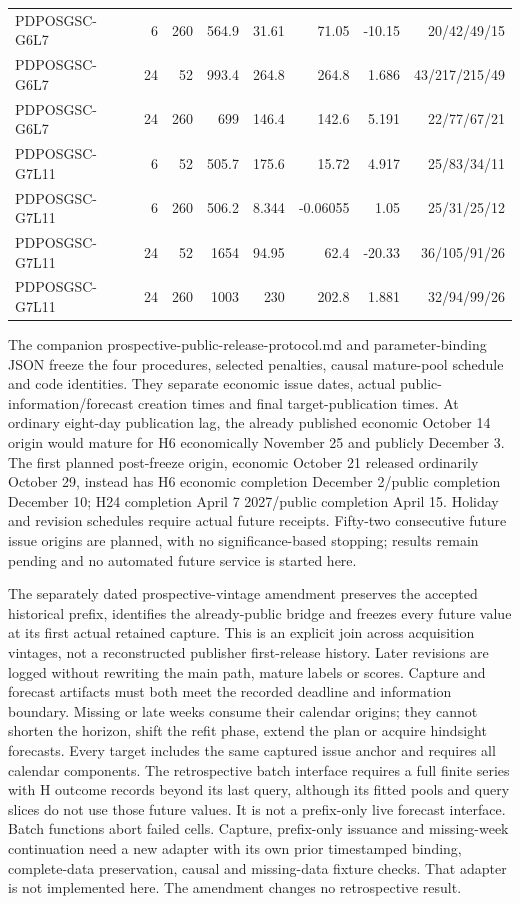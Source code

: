 \documentclass[10pt,a4paper]{article}
\begin{document}
\begin{center}
\begin{minipage}{\linewidth}
\begin{tabular}{lrrrrrrr}
PDPOSGSC-G6L7 & 6 & 260 & 564.9 & 31.61 & 71.05 & -10.15 & 20/42/49/15 \\
PDPOSGSC-G6L7 & 24 & 52 & 993.4 & 264.8 & 264.8 & 1.686 & 43/217/215/49 \\
PDPOSGSC-G6L7 & 24 & 260 & 699 & 146.4 & 142.6 & 5.191 & 22/77/67/21 \\
PDPOSGSC-G7L11 & 6 & 52 & 505.7 & 175.6 & 15.72 & 4.917 & 25/83/34/11 \\
PDPOSGSC-G7L11 & 6 & 260 & 506.2 & 8.344 & -0.06055 & 1.05 & 25/31/25/12 \\
PDPOSGSC-G7L11 & 24 & 52 & 1654 & 94.95 & 62.4 & -20.33 & 36/105/91/26 \\
PDPOSGSC-G7L11 & 24 & 260 & 1003 & 230 & 202.8 & 1.881 & 32/94/99/26 \\
\bottomrule
\end{tabular}
\end{minipage}
\end{center}
The companion prospective-public-release-protocol.md and parameter-binding JSON freeze the four procedures, selected penalties, causal mature-pool schedule and code identities. They separate economic issue dates, actual public-information/forecast creation times and final target-publication times. At ordinary eight-day publication lag, the already published economic October 14 origin would mature for H6 economically November 25 and publicly December 3. The first planned post-freeze origin, economic October 21 released ordinarily October 29, instead has H6 economic completion December 2/public completion December 10; H24 completion April 7 2027/public completion April 15. Holiday and revision schedules require actual future receipts. Fifty-two consecutive future issue origins are planned, with no significance-based stopping; results remain pending and no automated future service is started here.

The separately dated prospective-vintage amendment preserves the accepted historical prefix, identifies the already-public bridge and freezes every future value at its first actual retained capture. This is an explicit join across acquisition vintages, not a reconstructed publisher first-release history. Later revisions are logged without rewriting the main path, mature labels or scores. Capture and forecast artifacts must both meet the recorded deadline and information boundary. Missing or late weeks consume their calendar origins; they cannot shorten the horizon, shift the refit phase, extend the plan or acquire hindsight forecasts. Every target includes the same captured issue anchor and requires all calendar components. The retrospective batch interface requires a full finite series with H outcome records beyond its last query, although its fitted pools and query slices do not use those future values. It is not a prefix-only live forecast interface. Batch functions abort failed cells. Capture, prefix-only issuance and missing-week continuation need a new adapter with its own prior timestamped binding, complete-data preservation, causal and missing-data fixture checks. That adapter is not implemented here. The amendment changes no retrospective result.
\end{document}
